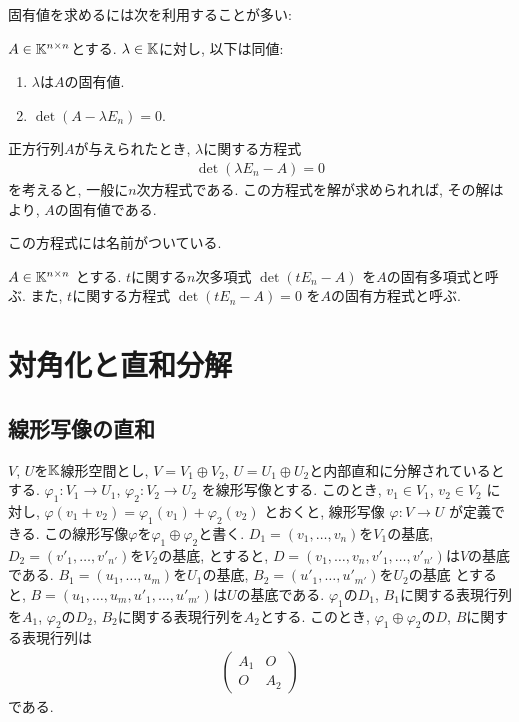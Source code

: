 固有値を求めるには次を利用することが多い:
\begin{prop}
\label{prop:mat:eignevalue:rootofcharpoly}
  $A\in\mathbb{K}^{n\times n}$とする.
  $\lambda \in \mathbb{K}$に対し, 以下は同値:
  \begin{enumerate}
  \item $\lambda$は$A$の固有値.
  \item $\det(A-\lambda E_n)=0$.
  \end{enumerate}
\end{prop}

正方行列$A$が与えられたとき,
$\lambda$に関する方程式
\begin{align*}
\det(\lambda E_n-A)=0
\end{align*}
を考えると,
一般に$n$次方程式である.
この方程式を解が求められれば,
その解は
より,
$A$の固有値である.

この方程式には名前がついている.

\begin{definition}
$A\in\mathbb{K}^{n\times n}$
とする.
$t$に関する$n$次多項式
$\det(t E_n-A)$
を$A$の固有多項式と呼ぶ.
また,
$t$に関する方程式
$\det(t E_n-A)=0$
を$A$の固有方程式と呼ぶ.
\end{definition}

\begin{quiz}
\end{quiz}



\chapter{対角化と直和分解}
\section{線形写像の直和}
$V$, $U$を$\mathbb{K}$線形空間とし,
$V=V_1\oplus V_2$,
$U=U_1\oplus U_2$と内部直和に分解されているとする.
$\varphi_1\colon V_1\to U_1$,
$\varphi_2\colon V_2\to U_2$
を線形写像とする.
このとき,
$v_1\in V_1$, $v_2\in V_2$
に対し,
$\varphi(v_1+v_2)=\varphi_1(v_1)+\varphi_2(v_2)$
とおくと,
線形写像
$\varphi\colon V\to U$
が定義できる.
この線形写像$\varphi$を$\varphi_1\oplus \varphi_2$と書く.
$D_1=(v_1,\ldots,v_n)$を$V_1$の基底,
$D_2=(v'_1,\ldots,v'_{n'})$を$V_2$の基底,
とすると,
$D=(v_1,\ldots,v_n,v'_1,\ldots,v'_{n'})$は$V$の基底である.
$B_1=(u_1,\ldots,u_m)$を$U_1$の基底,
$B_2=(u'_1,\ldots,u'_{m'})$を$U_2$の基底
とすると,
$B=(u_1,\ldots,u_m,u'_1,\ldots,u'_{m'})$は$U$の基底である.
$\varphi_1$の$D_1$, $B_1$に関する表現行列を$A_1$,
$\varphi_2$の$D_2$, $B_2$に関する表現行列を$A_2$とする.
このとき,
$\varphi_1\oplus \varphi_2$の$D$, $B$に関する表現行列は
\begin{align*}
  \begin{pmatrix}A_1&O\\O&A_2\end{pmatrix}
\end{align*}
である.

